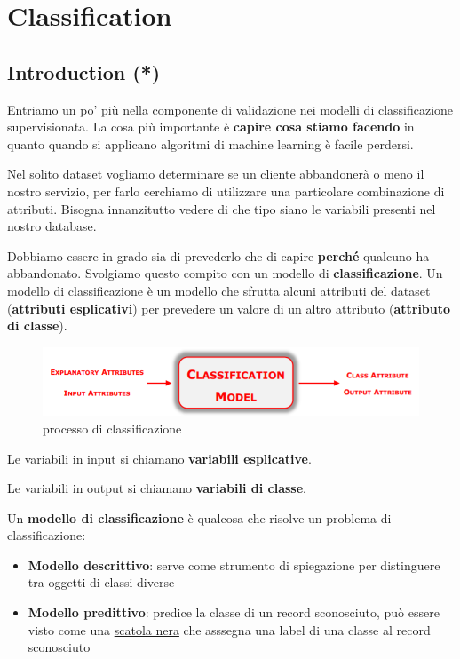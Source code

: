 \section{Classification}

\subsection{Introduction (*)}
Entriamo un po' più nella componente di validazione nei modelli di classificazione supervisionata.
La cosa più importante è \textbf{capire cosa stiamo facendo} in quanto quando si applicano algoritmi di machine learning è facile perdersi.

Nel solito dataset vogliamo determinare se un cliente abbandonerà o meno il nostro servizio, per farlo cerchiamo di utilizzare una particolare combinazione di attributi. Bisogna innanzitutto vedere di che tipo siano le variabili presenti nel nostro database.

Dobbiamo essere in grado sia di prevederlo che di capire \textbf{perché} qualcuno ha abbandonato. Svolgiamo questo compito con un modello di \textbf{classificazione}. Un modello di classificazione è un modello che sfrutta alcuni attributi del dataset (\textbf{attributi esplicativi}) per prevedere un valore di un altro attributo (\textbf{attributo di classe}).

\begin{figure}[H]
	\hspace{-0.5cm}
	\includegraphics[height=0.2 \linewidth]{classification/pict/class_model.png}
	\caption{processo di classificazione}
\end{figure}

\begin{defn}
	Le variabili in input si chiamano \textbf{variabili esplicative}.
\end{defn}

\begin{defn}
	Le variabili in output si chiamano \textbf{variabili di classe}.
\end{defn}

\begin{defn}
	 Un \textbf{modello di classificazione} è qualcosa che risolve un problema di classificazione:
	\begin{itemize}
		\item \textbf{Modello descrittivo}: serve come strumento di spiegazione per distinguere tra oggetti di classi diverse
		\item \textbf{Modello predittivo}: predice la classe di un record sconosciuto, pu\`o essere visto come una \underline{scatola nera} che asssegna una label di una classe al record sconosciuto
	\end{itemize}
\end{defn}


